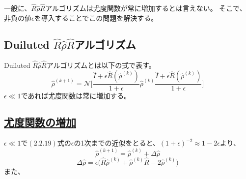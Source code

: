 \documentclass[11pt,a4j,notitlepage]{jreport}
\begin{document}
	一般に、$\hat{R} \hat{\rho} \hat{R}$アルゴリズムは尤度関数が常に増加するとは言えない。
	そこで、非負の値$\epsilon$を導入することでこの問題を解決する。

	\subsection{Duiluted $\hat{R} \hat{\rho} \hat{R}$アルゴリズム}

	Duiluted $\hat{R} \hat{\rho} \hat{R}$アルゴリズムとは以下の式で表す。
	\begin{equation}
		\hat{\rho}^{(k+1)} = \mathcal{N} \Bigg[ \frac{\hat{I} + \epsilon \hat{R} (\hat{\rho}^{(k)})}{1+\epsilon} \hat{\rho}^{(k)} \frac{\hat{I} + \epsilon \hat{R} (\hat{\rho}^{(k)})}{1+\epsilon} \Bigg]
	\end{equation}
	$\epsilon \ll 1$であれば尤度関数は常に増加する。

	\subsection*{\underline{尤度関数の増加}}

	$\epsilon \ll 1$で$(2.2.19)$式の$\epsilon$の1次までの近似をとると、$(1 + \epsilon)^{-2} \approx 1 - 2\epsilon$より、
	\begin{equation}
		\hat{\rho}^{(k+1)} = \hat{\rho}^{(k)} + \Delta \hat{\rho}
	\end{equation}
	\begin{equation}
		\Delta \hat{\rho} = \epsilon \big( \hat{R} \hat{\rho}^{(k)} + \hat{\rho}^{(k)} \hat{R} -2 \hat{\rho}^{(k)} \big)
	\end{equation}
	また、
\end{document}
